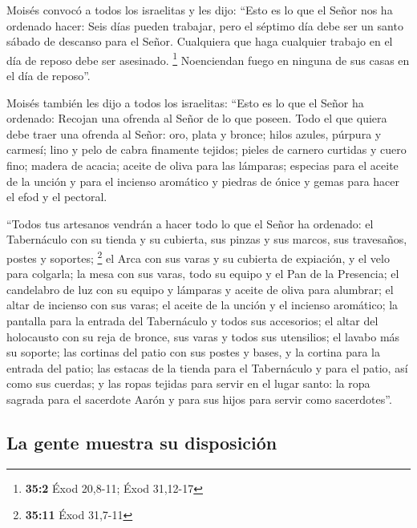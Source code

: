  Moisés convocó a todos los israelitas y les dijo: ``Esto
es lo que el Señor nos ha ordenado hacer:  Seis días
pueden trabajar, pero el séptimo día debe ser un santo sábado de
descanso para el Señor. Cualquiera que haga cualquier trabajo en el día
de reposo debe ser asesinado. \footnote{\textbf{35:2} Éxod 20,8-11; Éxod
  31,12-17}  Noenciendan fuego en ninguna de sus casas en
el día de reposo''.

 Moisés también les dijo a todos los israelitas: ``Esto es
lo que el Señor ha ordenado:  Recojan una ofrenda al Señor
de lo que poseen. Todo el que quiera debe traer una ofrenda al Señor:
oro, plata y bronce;  hilos azules, púrpura y carmesí;
lino y pelo de cabra finamente tejidos;  pieles de carnero
curtidas y cuero fino; madera de acacia;  aceite de oliva
para las lámparas; especias para el aceite de la unción y para el
incienso aromático  y piedras de ónice y gemas para hacer
el efod y el pectoral.

 ``Todos tus artesanos vendrán a hacer todo lo que el
Señor ha ordenado:  el Tabernáculo con su tienda y su
cubierta, sus pinzas y sus marcos, sus travesaños, postes y soportes;
\footnote{\textbf{35:11} Éxod 31,7-11}  el Arca con sus
varas y su cubierta de expiación, y el velo para colgarla;
 la mesa con sus varas, todo su equipo y el Pan de la
Presencia;  el candelabro de luz con su equipo y lámparas
y aceite de oliva para alumbrar;  el altar de incienso
con sus varas; el aceite de la unción y el incienso aromático; la
pantalla para la entrada del Tabernáculo y todos sus accesorios;
 el altar del holocausto con su reja de bronce, sus varas
y todos sus utensilios; el lavabo más su soporte;  las
cortinas del patio con sus postes y bases, y la cortina para la entrada
del patio;  las estacas de la tienda para el Tabernáculo
y para el patio, así como sus cuerdas;  y las ropas
tejidas para servir en el lugar santo: la ropa sagrada para el sacerdote
Aarón y para sus hijos para servir como sacerdotes''.

\hypertarget{la-gente-muestra-su-disposiciuxf3n}{%
\subsection{La gente muestra su
disposición}\label{la-gente-muestra-su-disposiciuxf3n}}

